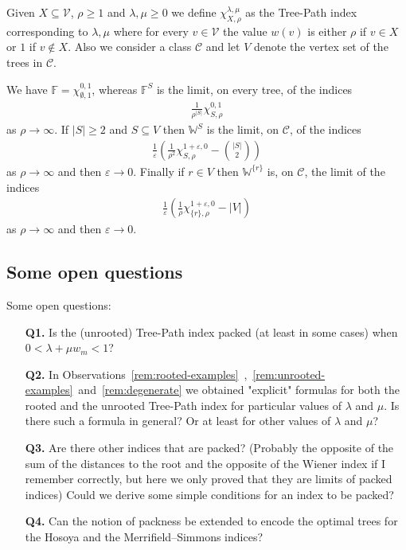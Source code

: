 \documentclass[11 pt]{modarticle}
\newcommand{\vset}{\mathcal{V}}
\newcommand{\wmap}{w}
\newcommand{\wmin}{w_m}
\newcommand{\size}[1]{|#1|}
\newcommand{\tclass}{\mathcal{C}}
\begin{document}
Given $X \subseteq \vset$, $\rho \geq 1$ and $\lambda, \mu \geq 0$ we define $\chi^{\lambda, \mu}_{X, \rho}$ as the Tree-Path index corresponding to $\lambda, \mu$ where for every $v \in \vset$ the value $\wmap(v)$ is either $\rho$ if $v \in X$ or $1$ if $v \notin X$. Also we consider a class $\tclass$ and let $V$ denote the vertex set of the trees in $\tclass$.


We have $\mathbb{F} = \chi^{0,1}_{\emptyset, 1}$, whereas $\mathbb{F}^S$ is the limit, on every tree, of the indices
\begin{eqnarray*}
	\frac{1}{\rho^{\size{S}}} \chi^{0,1}_{S,\rho}
\end{eqnarray*}
as $\rho \rightarrow \infty$. If $\size{S} \geq 2$ and $S \subseteq V$ then $\mathbb{W}^S$ is the limit, on $\tclass$, of the indices
\begin{eqnarray*}
	\frac{1}{\varepsilon}\left(\frac{1}{\rho^2} \chi^{1+\varepsilon,0}_{S,\rho} - {\binom{\size{S}}{2}} \right)
\end{eqnarray*}
as $\rho \rightarrow \infty$ and then $\varepsilon \rightarrow 0$. Finally if $r \in V$ then $\mathbb{W}^{\{r\}}$ is, on $\tclass$, the limit of the indices
\begin{eqnarray*}
	\frac{1}{\varepsilon}\left(\frac{1}{\rho}\chi^{1+\varepsilon,0}_{\{r\},\rho}-\size{V}\right)
\end{eqnarray*}
as $\rho \rightarrow \infty$ and then $\varepsilon \rightarrow 0$.

\subsection{Some open questions}

Some open questions:
\begin{itemize}
\item[\textbf{Q1.}] Is the (unrooted) Tree-Path index packed (at least in some cases) when $0 < \lambda + \mu \wmin < 1$?
\item[\textbf{Q2.}] In Observations~\ref{rem:rooted-examples}~,~\ref{rem:unrooted-examples}~and~\ref{rem:degenerate} we obtained "explicit" formulas for both the rooted and the unrooted Tree-Path index for particular values of $\lambda$ and $\mu$. Is there such a formula in general? Or at least for other values of $\lambda$ and $\mu$?
\item[\textbf{Q3.}] Are there other indices that are packed? (Probably the opposite of the sum of the distances to the root and the opposite of the Wiener index if I remember correctly, but here we only proved that they are limits of packed indices) Could we derive some simple conditions for an index to be packed?
\item[\textbf{Q4.}] Can the notion of packness be extended to encode the optimal trees for the Hosoya and the Merrifield–Simmons\cite{andriantiana} indices?
\end{itemize}
\end{document}
